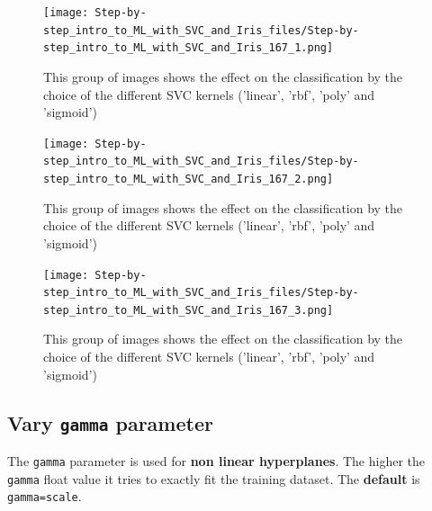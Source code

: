\documentclass [oneside,10pt,a4paper,ngerman,BCOR10mm,headsepline,parindent,final]{scrartcl}
\begin{document}
    \begin{figure}
        \begin{center}\texttt{[image: Step-by-step\_intro\_to\_ML\_with\_SVC\_and\_Iris\_files/Step-by-step\_intro\_to\_ML\_with\_SVC\_and\_Iris\_167\_1.png]}\end{center}
        \caption{This group of images shows the effect on the classification by the choice of the different SVC kernels ('linear', 'rbf', 'poly' and 'sigmoid')}
        \label{fig:vary_kernels}
    \end{figure}
    
    \begin{figure}
        \begin{center}\texttt{[image: Step-by-step\_intro\_to\_ML\_with\_SVC\_and\_Iris\_files/Step-by-step\_intro\_to\_ML\_with\_SVC\_and\_Iris\_167\_2.png]}\end{center}
        \caption{This group of images shows the effect on the classification by the choice of the different SVC kernels ('linear', 'rbf', 'poly' and 'sigmoid')}
        \label{fig:vary_kernels}
    \end{figure}
    
    \begin{figure}
        \begin{center}\texttt{[image: Step-by-step\_intro\_to\_ML\_with\_SVC\_and\_Iris\_files/Step-by-step\_intro\_to\_ML\_with\_SVC\_and\_Iris\_167\_3.png]}\end{center}
        \caption{This group of images shows the effect on the classification by the choice of the different SVC kernels ('linear', 'rbf', 'poly' and 'sigmoid')}
        \label{fig:vary_kernels}
    \end{figure}
    
    \hypertarget{vary-gamma-parameter}{%
\subsection{\texorpdfstring{Vary \texttt{gamma}
parameter}{Vary gamma parameter}}\label{vary-gamma-parameter}}

The \texttt{gamma} parameter is used for \textbf{non linear
hyperplanes}. The higher the \texttt{gamma} float value it tries to
exactly fit the training dataset. The \textbf{default} is
\texttt{gamma=\textquotesingle{}scale\textquotesingle{}}.
\end{document}
